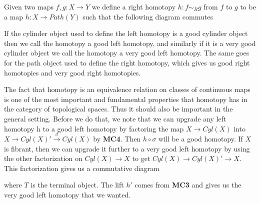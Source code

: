 \begin{definition}
Given two maps $f,g: X\rightarrow Y$ we define a right homotopy $h:f\sim_R g$ from $f$ to $g$ to be a map $h: X\rightarrow Path(Y)$ such that the following diagram commutes
\begin{center}
\end{center}
\end{definition}

If the cylinder object used to define the left homotopy is a good cylinder object then we call the homotopy a good left homotopy, and similarly if it is a very good cylinder object we call the homotopy a very good left homotopy. The same goes for the path object used to define the right homotopy, which gives us good right homotopies and very good right homotopies.

The fact that homotopy is an equivalence relation on classes of continuous maps is one of the most important and fundamental properties that homotopy has in the category of topological spaces. Thus it should also be important in the general setting. Before we do that, we note that we can upgrade any left homotopy h to a good left homotopy by factoring the map $X\rightarrow Cyl(X)$ into $X\rightarrow Cyl(X)' \overset{\sigma}\rightarrow Cyl(X)$ by \textbf{MC4}. Then $h\circ \sigma$ will be a good homotopy. If $X$ is fibrant, then we can upgrade it further to a very good left homotopy by using the other factorization on $Cyl(X)\rightarrow X$ to get $Cyl(X)\rightarrow Cyl(X)'\rightarrow X$. This factorization gives us a commutative diagram
\begin{center}
\end{center}
where $T$ is the terminal object. The lift $h'$ comes from \textbf{MC3} and gives us the very good left homotopy that we wanted. 

